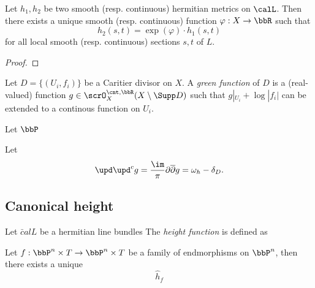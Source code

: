 \begin{proposition}\label{prop:hermitian_metric_different_by_a_smooth_function_on_a_fixed_line_bundle}
	Let \(h_1,h_2\) be two smooth (resp. continuous) hermitian metrics on $\calL$.
	Then there exists a unique smooth (resp. continuous) function \(\varphi: X \to \bbR\) such that
	\[h_2(s,t) = \exp(\varphi) \cdot h_1(s,t)\]
	for all local smooth (resp. continuous) sections \(s,t\) of \(L\).
\end{proposition}
\begin{proof}
\end{proof}

\begin{definition}\label{def:green-functions-for-a-divisor}
	Let $D = \{(U_i,f_i)\}$ be a Caritier divisor on $X$.
	A \emph{green function} of $D$ is a (real-valued) function $g \in \scrO_{X}^{\cnt,\bbR}(X \setminus \Supp D)$ such that $g|_{U_i} + \log |f_i|$ can be extended to a continous function on $U_i$.
\end{definition}

\begin{example}
	Let $\bbP$

\end{example}

\begin{proposition}
\end{proposition}

\begin{theorem}
	Let
	\[ \upd \upd^c g = \frac{\im}{\pi} \partial \overline{\partial} g = \omega_h - \delta_D. \]
	\Yang{}
\end{theorem}



\subsection[status=draft,tag=0000000,label=\labelNFM{subsec:on-complex-dynamics}]{Canonical height}

\begin{definition}[label=\labelNFM{def:height-function-by-metrized-line-bundle}, status=draft, tag=0000000]
	Let $\bar calL$ be a hermitian line bundles
	The \emph{height function} is defined as
	\Yang{}
\end{definition}

\begin{proposition}[label=\labelNFM{prop:canonical-height-for-family-of-endomorphism-on-pn}, status=draft, tag=0000000]
	Let $f: \bbP^n \times T \to \bbP^n \times T$ be a family of endmorphisms on $\bbP^n$, then there exists a unique
	\[ \hat{h}_f \]
	\Yang{}
\end{proposition}

